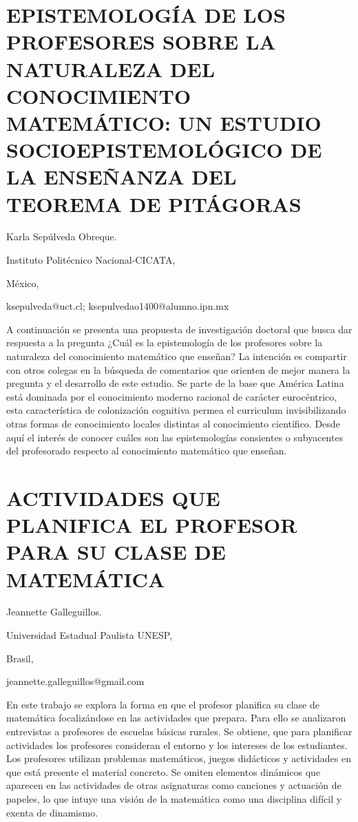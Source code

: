 \section{EPISTEMOLOGÍA DE LOS PROFESORES SOBRE LA NATURALEZA DEL CONOCIMIENTO
MATEMÁTICO: UN ESTUDIO SOCIOEPISTEMOLÓGICO DE LA ENSEÑANZA DEL TEOREMA
DE PITÁGORAS}

\begin{datos}

Karla Sepúlveda Obreque.

Instituto Politécnico Nacional-CICATA,

México,

ksepulveda@uct.cl; ksepulvedao1400@alumno.ipn.mx

\end{datos}

A continuación se presenta una propuesta de investigación doctoral
que busca dar respuesta a la pregunta ¿Cuál es la epistemología de
los profesores sobre la naturaleza del conocimiento matemático que
enseñan? La intención es compartir con otros colegas en la búsqueda
de comentarios que orienten de mejor manera la pregunta y el desarrollo
de este estudio. Se parte de la base que América Latina está dominada
por el conocimiento moderno racional de carácter eurocéntrico, esta
característica de colonización cognitiva permea el curriculum invisibilizando
otras formas de conocimiento locales distintas al conocimiento científico.
Desde aquí el interés de conocer cuáles son las epistemologías consientes
o subyacentes del profesorado respecto al conocimiento matemático
que enseñan. 


\section{\uppercase{ ACTIVIDADES QUE planifica el profesor PARA su clase
de Matemática}}

\begin{datos}

Jeannette Galleguillos.

Universidad Estadual Paulista UNESP,

Brasil,

jeannette.galleguillos@gmail.com

\end{datos}

En este trabajo se explora la forma en que el profesor planifica su
clase de matemática focalizándose en las actividades que prepara.
Para ello se analizaron entrevistas a profesores de escuelas básicas
rurales. Se obtiene, que para planificar actividades los profesores
consideran el entorno y los intereses de los estudiantes. Los profesores
utilizan problemas matemáticos, juegos didácticos y actividades en
que está presente el material concreto. Se omiten elementos dinámicos
que aparecen en las actividades de otras asignaturas como canciones
y actuación de papeles, lo que intuye una visión de la matemática
como una disciplina difícil y exenta de dinamismo.



